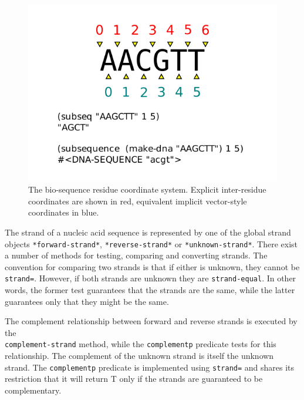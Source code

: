 \documentclass[a4paper, 12pt]{article}
\begin{document}
\begin{figure}[tbph]
  \begin{center}
    \includegraphics[scale=1.0]{inter-residue-coordinates.pdf}
  \end{center}
  \caption{The bio-sequence residue coordinate system. Explicit
    inter-residue coordinates are shown in red, equivalent implicit
    vector-style coordinates in blue.}
  \label{fig:inter-residue-coords}
\end{figure}

The strand of a nucleic acid sequence is represented by one of the
global strand objects \lstinline!*forward-strand*!,
\lstinline!*reverse-strand*! or \lstinline!*unknown-strand*!. There
exist a number of methods for testing, comparing and converting
strands. The convention for comparing two strands is that if either is
unknown, they cannot be \lstinline!strand=!. However, if both strands
are unknown they are \lstinline!strand-equal!. In other words, the
former test guarantees that the strands are the same, while the latter
guarantees only that they might be the same.

The complement relationship between forward and reverse strands is
executed by the \\ \lstinline!complement-strand! method, while the
\lstinline!complementp! predicate tests for this relationship. The
complement of the unknown strand is itself the unknown strand. The
\lstinline!complementp! predicate is implemented using
\lstinline!strand=! and shares its restriction that it will return T
only if the strands are guaranteed to be complementary.
\end{document}
